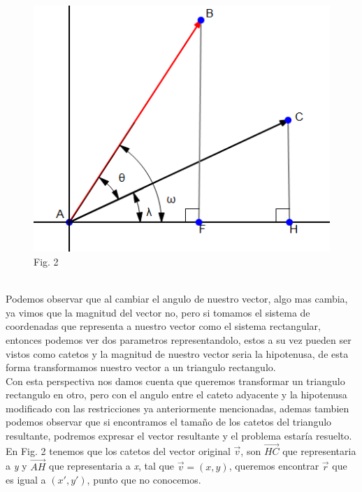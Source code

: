 \documentclass{article}
\begin{document}
\begin{figure}
  \centering
  \includegraphics[width=0.4\columnwidth]{2.png}
    Fig. 2
\end{figure}
\hfill
\\
\hfill
Podemos observar que al cambiar el angulo de nuestro vector, algo mas cambia, ya vimos que la magnitud del vector no, pero si tomamos el sistema de coordenadas que representa a nuestro vector como el sistema rectangular, entonces podemos ver dos parametros representandolo, estos a su vez pueden ser vistos como catetos y la magnitud de nuestro vector seria la hipotenusa, de esta forma transformamos nuestro vector a un triangulo rectangulo.\\
Con esta perspectiva nos damos cuenta que queremos transformar un triangulo rectangulo en otro, pero con el angulo entre el cateto adyacente y la hipotenusa modificado con las restricciones ya anteriormente mencionadas, ademas tambien podemos observar que si encontramos el tamaño de los catetos del triangulo resultante, podremos expresar el vector resultante y el problema estaría resuelto.\\
En Fig. 2 tenemos que los catetos del vector original  \begin{math}\overrightarrow{v}\end{math}, son 
\begin{math}\overrightarrow{HC}\end{math} que representaria a \textit{y} y \begin{math}\overrightarrow{AH}\end{math} que representaria a \textit{x}, tal que \begin{math}
\overrightarrow{v} = (x,y)\end{math}, queremos encontrar \begin{math}\overrightarrow{r}\end{math} que es igual a \begin{math}(x',y')\end{math}, punto que no conocemos.\\
\end{document}
